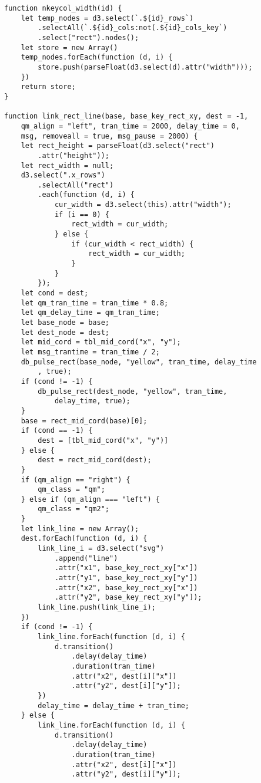 \begin{lstlisting}
function nkeycol_width(id) {
    let temp_nodes = d3.select(`.${id}_rows`)
        .selectAll(`.${id}_cols:not(.${id}_cols_key`)
        .select("rect").nodes();
    let store = new Array()
    temp_nodes.forEach(function (d, i) {
        store.push(parseFloat(d3.select(d).attr("width")));
    })
    return store;
}

function link_rect_line(base, base_key_rect_xy, dest = -1, 
    qm_align = "left", tran_time = 2000, delay_time = 0,
    msg, removeall = true, msg_pause = 2000) {
    let rect_height = parseFloat(d3.select("rect")
        .attr("height"));
    let rect_width = null;
    d3.select(".x_rows")
        .selectAll("rect")
        .each(function (d, i) {
            cur_width = d3.select(this).attr("width");
            if (i == 0) {
                rect_width = cur_width;
            } else {
                if (cur_width < rect_width) {
                    rect_width = cur_width;
                }
            }
        });
    let cond = dest;
    let qm_tran_time = tran_time * 0.8;
    let qm_delay_time = qm_tran_time;
    let base_node = base;
    let dest_node = dest;
    let mid_cord = tbl_mid_cord("x", "y");
    let msg_trantime = tran_time / 2;
    db_pulse_rect(base_node, "yellow", tran_time, delay_time
        , true);
    if (cond != -1) {
        db_pulse_rect(dest_node, "yellow", tran_time, 
            delay_time, true);
    }
    base = rect_mid_cord(base)[0];
    if (cond == -1) {
        dest = [tbl_mid_cord("x", "y")]
    } else {
        dest = rect_mid_cord(dest);
    }
    if (qm_align == "right") {
        qm_class = "qm";
    } else if (qm_align === "left") {
        qm_class = "qm2";
    }
    let link_line = new Array();
    dest.forEach(function (d, i) {
        link_line_i = d3.select("svg")
            .append("line")
            .attr("x1", base_key_rect_xy["x"])
            .attr("y1", base_key_rect_xy["y"])
            .attr("x2", base_key_rect_xy["x"])
            .attr("y2", base_key_rect_xy["y"]);
        link_line.push(link_line_i);
    })
    if (cond != -1) {
        link_line.forEach(function (d, i) {
            d.transition()
                .delay(delay_time)
                .duration(tran_time)
                .attr("x2", dest[i]["x"])
                .attr("y2", dest[i]["y"]);
        })
        delay_time = delay_time + tran_time;
    } else {
        link_line.forEach(function (d, i) {
            d.transition()
                .delay(delay_time)
                .duration(tran_time)
                .attr("x2", dest[i]["x"])
                .attr("y2", dest[i]["y"]);

\end{lstlisting}
